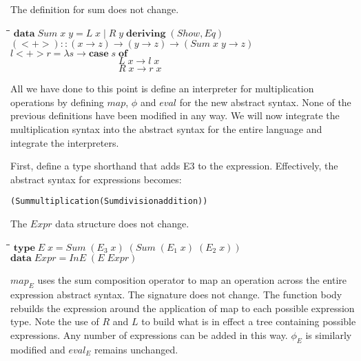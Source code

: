 \documentclass[10pt]{article}
\newlength{\lwidth}\setlength{\lwidth}{4.5cm}
\newlength{\cwidth}\setlength{\cwidth}{8mm} %
\newcommand{\Conid}[1]{\mathit{#1}}
\newcommand{\Varid}[1]{\mathit{#1}}
\begin{document}
The definition for sum does not change.

\begin{tabbing}
\qquad\=\hspace{\lwidth}\=\hspace{\cwidth}\=\+\kill
${\mathbf{data}\;\Conid{Sum}\;\Varid{x}\;\Varid{y}\mathrel{=}\Conid{L}\;\Varid{x}\mid \Conid{R}\;\Varid{y}\;\mathbf{deriving}\;(\Conid{Show},\Conid{Eq})}$\\
${}$\\
${(\mathbin{<+>})\mathbin{::}(\Varid{x}\to \Varid{z})\to (\Varid{y}\to \Varid{z})\to (\Conid{Sum}\;\Varid{x}\;\Varid{y}\to \Varid{z})}$\\
${\Varid{l}\mathbin{<+>}\Varid{r}\mathrel{=}\lambda \Varid{s}\to \mathbf{case}\;\Varid{s}\;\mathbf{of}}$\\
${\phantom{\Varid{l}\mathbin{<+>}\Varid{r}\mathrel{=}\lambda \Varid{s}\to \mathbf{case}\;\Varid{s}\;\mbox{}}\Conid{L}\;\Varid{x}\to \Varid{l}\;\Varid{x}}$\\
${\phantom{\Varid{l}\mathbin{<+>}\Varid{r}\mathrel{=}\lambda \Varid{s}\to \mathbf{case}\;\Varid{s}\;\mbox{}}\Conid{R}\;\Varid{x}\to \Varid{r}\;\Varid{x}}$
\end{tabbing}
All we have done to this point is define an interpreter for
multiplication operations by defining \ensuremath{\Varid{map}}, \ensuremath{\Varid{\phi}} and \ensuremath{\Varid{eval}} for the
new abstract syntax.  None of the previous definitions have been
modified in any way.  We will now integrate the multiplication syntax
into the abstract syntax for the entire language and integrate the
interpreters.

First, define a type shorthand that adds E3 to the expression.
Effectively, the abstract syntax for expressions becomes:

\begin{alltt}
  (Sum multiplication (Sum division addition)) 
\end{alltt}

The \ensuremath{\Conid{Expr}} data structure does not change.

\begin{tabbing}
\qquad\=\hspace{\lwidth}\=\hspace{\cwidth}\=\+\kill
${\mathbf{type}\;\Conid{E}\;\Varid{x}\mathrel{=}\Conid{Sum}\;(\Varid{E}_3\;\Varid{x})\;(\Conid{Sum}\;(\Varid{E}_1\;\Varid{x})\;(\Varid{E}_2\;\Varid{x}))}$\\
${}$\\
${\mathbf{data}\;\Conid{Expr}\mathrel{=}\Conid{InE}\;(\Conid{E}\;\Conid{Expr})}$
\end{tabbing}
\ensuremath{\Varid{map}_E} uses the sum composition operator to map an operation across
the entire expression abstract syntax.  The signature does not change.
The function body rebuilds the expression around the application of
map to each possible expression type.  Note the use of \ensuremath{\Conid{R}} and \ensuremath{\Conid{L}} to
build what is in effect a tree containing possible expressions.  Any
number of expressions can be added in this way.  \ensuremath{\Varid{\phi}_E} is similarly
modified and \ensuremath{\Varid{eval}_E} remains unchanged.
\end{document}
